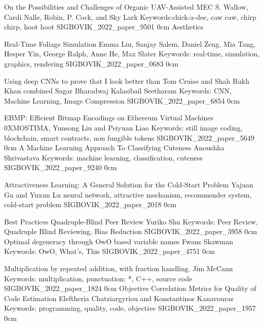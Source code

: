 \addpaper
    {On the Possibilities and Challenges of Organic UAV-Assisted MEC}
    {S. Wallow, Cardi Nalle, Robin, P. Cock, and Sky Lark}
    {Keywords:chick-a-dee, caw caw, chirp chirp, hoot hoot}
    {SIGBOVIK_2022_paper_9501}
    {0cm}
    {}
\addtrack
    {}{Aesthetics}

\addpaper
    {Real-Time Foliage Simulation}
    {Emma Liu, Sanjay Salem, Daniel Zeng, Mia Tang, Hesper Yin, George Ralph, Anne He, Max Slater}
    {Keywords: real-time, simulation, graphics, rendering}
    {SIGBOVIK_2022_paper_0683}
    {0cm}
    {}

\addpaper
    {Using deep CNNs to prove that I look better than Tom Cruise and Shah Rukh Khan combined}
    {Sagar Bharadwaj Kalasibail Seetharam}
    {Keywords: CNN, Machine Learning, Image Compression}
    {SIGBOVIK_2022_paper_6854}
    {0cm}
    {}

\addpaper
    {EBMP: Efficient Bitmap Encodings on Ethereum Virtual Machines}
    {0XMOSTIMA, Yunsong Liu and Peiyuan Liao}
    {Keywords: still image coding, blockchain, smart contracts, non fungible tokens}
    {SIGBOVIK_2022_paper_5649}
    {0cm}
    {}
\addpaper
    {A Machine Learning Approach To Classifying Cuteness}
    {Anoushka Shrivastava}
    {Keywords: machine learning, classification, cuteness}
    {SIGBOVIK_2022_paper_9240}
    {0cm}
    {}

\addpaper
    {Attractiveness Learning: A General Solution for the Cold-Start Problem}
    {Yajuan Gu and Yuxun Lu}
    {neural network, attractive mechanism, recommender system, cold-start problem}
    {SIGBOVIK_2022_paper_2018}
    {0cm}
    {}

\addtrack
    {}{Best Practices}
\addpaper
    {Quadruple-Blind Peer Review}
    {Yuriko Shu}
    {Keywords: Peer Review, Quadruple Blind Reviewing, Bias Reduction}
    {SIGBOVIK_2022_paper_3958}
    {0cm}
    {}
\addpaper
    {Optimal degeneracy through OwO based variable names}
    {Fwans Skawman}
    {Keywords: OwO, What's, This}
    {SIGBOVIK_2022_paper_4751}
    {0cm}
    {}

\addpaper
    {Multiplication by repeated addition, with fraction handling.}
    {Jim McCann}
    {Keywords: multiplication, punctuation: *, C++, source code}
    {SIGBOVIK_2022_paper_1824}
    {0cm}
    {}
\addpaper
    {Objective Correlation Metrics for Quality of Code Estimation}
    {Eleftheria Chatziargyriou and Konstantinos Kanavouras}
    {Keywords: programming, quality, code, objective}
    {SIGBOVIK_2022_paper_1957}
    {0cm}
    {}




